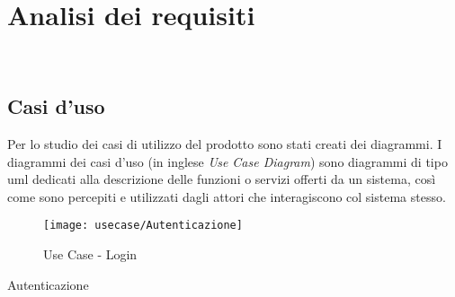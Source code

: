 
\chapter{Analisi dei requisiti}
\label{cap:analisi-requisiti}

\\

\section{Casi d'uso}

Per lo studio dei casi di utilizzo del prodotto sono stati creati dei diagrammi.
I diagrammi dei casi d'uso (in inglese \emph{Use Case Diagram}) sono diagrammi di tipo \gls{uml} dedicati alla descrizione delle funzioni o servizi offerti da un sistema, così come sono percepiti e utilizzati dagli attori che interagiscono col sistema stesso.



\begin{figure}[!ht] 
    \centering 
    \texttt{[image: usecase/Autenticazione]} 
    \caption{Use Case - Login}
\end{figure}

\begin{usecase}{1}{Autenticazione}
\label{uc:autenticazione}
\end{usecase}

